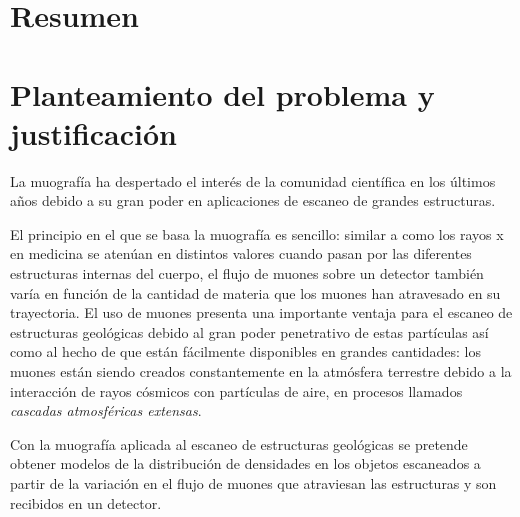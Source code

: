\documentclass[12pt]{report}
\begin{document}

\section*{Resumen}




\section*{Planteamiento del problema y justificación}

La muografía ha despertado el interés de la comunidad científica en los últimos años debido a su gran poder en aplicaciones de escaneo de grandes estructuras.

El principio en el que se basa la muografía es sencillo: similar a como los rayos x en medicina se atenúan en distintos valores cuando pasan por las diferentes estructuras internas del cuerpo, el flujo de muones sobre un detector también varía en función de la cantidad de materia que los muones han atravesado en su trayectoria. El uso de muones presenta una importante ventaja para el escaneo de estructuras geológicas debido al gran poder penetrativo de estas partículas así como al hecho de que están fácilmente disponibles en grandes cantidades: los muones están siendo creados constantemente en la atmósfera terrestre debido a la interacción de rayos cósmicos con partículas de aire, en procesos llamados \textit{cascadas atmosféricas extensas}.

Con la muografía aplicada al escaneo de estructuras geológicas se pretende obtener modelos de la distribución de densidades en los objetos escaneados a partir de la variación en el flujo de muones que atraviesan las estructuras y son recibidos en un detector.
\end{document}
